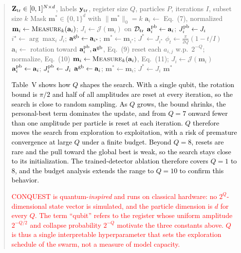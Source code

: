 \documentclass[11pt]{article}
\newenvironment{excerpt}{\begin{quote}\sloppy}{\end{quote}}
\begin{document}
\begin{excerpt}
\setcounter{algorithm}{0}
\begin{algorithm}[H]
\caption{\textcolor{black}{Variable-qubit QPSO feature
selection. Steps commented with Q are the only ones that depend on
the register size.}}

\color{black}
\small
\begin{algorithmic}[1]
\Require $\mathbf{Z}_{\rm tr}\in[0,1]^{N\times d}$, labels $\mathbf{y}_{\rm tr}$, register size $Q$, particles $P$, iterations $I$, subset size $k$
\Ensure Mask $\mathbf{m}^{*}\in\{0,1\}^{d}$ with $\|\mathbf{m}^{*}\|_0=k$
  \State $\mathbf{a}_i\gets$ Eq.~(7), normalized 
  \State $\mathbf{m}_i\gets\textsc{Measure}_k(\mathbf{a}_i)$; $J_i\gets\mathcal{J}(\mathbf{m}_i)$ on $\mathcal{D}_{\rm tr}$
  \State $\mathbf{a}_i^{\rm pb}\gets\mathbf{a}_i$; $J_i^{\rm pb}\gets J_i$
\EndFor
\State $i^{\star}\gets\arg\max_i J_i$; $\mathbf{a}^{\rm gb}\gets\mathbf{a}_{i^{\star}}$; $\mathbf{m}^{*}\gets\mathbf{m}_{i^{\star}}$; $J^{*}\gets J_{i^{\star}}$
  \State $\phi_t\gets\frac{\pi}{2Q}(1-t/I)$ 
    \State $\mathbf{a}_i\gets$ rotation toward $\mathbf{a}_i^{\rm pb},\mathbf{a}^{\rm gb}$, Eq.~(9)
    \State reset each $a_{i,j}$ w.p.\ $2^{-Q}$; normalize, Eq.~(10) 
    \State $\mathbf{m}_i\gets\textsc{Measure}_k(\mathbf{a}_i)$, Eq.~(11); $J_i\gets\mathcal{J}(\mathbf{m}_i)$
      \State $\mathbf{a}_i^{\rm pb}\gets\mathbf{a}_i$; $J_i^{\rm pb}\gets J_i$
    \EndIf
      \State $\mathbf{a}^{\rm gb}\gets\mathbf{a}_i$; $\mathbf{m}^{*}\gets\mathbf{m}_i$; $J^{*}\gets J_i$
    \EndIf
  \EndFor
\EndFor
\State \Return $\mathbf{m}^{*}$ 
\end{algorithmic}
\end{algorithm}

\textcolor{black}{Table~V shows
how $Q$ shapes the search. With a single qubit, the rotation bound is
$\pi/2$ and half of all amplitudes are reset at every iteration, so
the search is close to random sampling. As $Q$ grows, the bound
shrinks, the personal-best term dominates the update, and from $Q=7$
onward fewer than one amplitude per particle is reset at each
iteration. $Q$ therefore
moves the search from exploration to exploitation, with a risk of
premature convergence at large $Q$ under a finite budget. Beyond
$Q=8$, resets are rare and the pull toward the global best is weak,
so the search stays close to its initialization. The trained-detector
ablation therefore covers $Q=1$ to $8$, and the budget analysis
extends the range to $Q=10$ to confirm this behavior.}

\textcolor{black}{\textcolor{red}{CONQUEST is quantum-\emph{inspired} and runs
on classical hardware: no $2^{Q}$-dimensional state vector is
simulated, and the particle dimension is $d$ for every $Q$. The term
``qubit'' refers to the register whose uniform amplitude $2^{-Q/2}$
and collapse probability $2^{-Q}$ motivate the three constants
above. $Q$ is thus a single interpretable hyperparameter that sets
the exploration schedule of the swarm, not a measure of model
capacity.}}
\end{excerpt}
\end{document}
